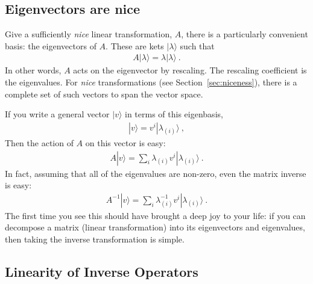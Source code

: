 \subsection{Eigenvectors are nice}
\label{sec:eigenvectors}

Give a sufficiently \emph{nice} linear transformation, $A$, there is a particularly convenient basis: the eigenvectors of $A$. These are kets $|\lambda\rangle$ such that
\begin{align}
  A |\lambda\rangle = \lambda |\lambda\rangle \ .
\end{align}
In other words, $A$ acts on the eigenvector by rescaling. The rescaling coefficient is the eigenvalues. For \emph{nice} transformations (see Section~\ref{sec:niceness}), there is a complete set of such vectors to span the vector space.

If you write a general vector $|v\rangle$ in terms of this eigenbasis,
\begin{align}
  |v\rangle = v^i |\lambda_{(i)} \rangle \ ,
\end{align}
Then the action of $A$ on this vector is easy:
\begin{align}
  A |v\rangle = \sum_i \lambda_{(i)} v^i |\lambda_{(i)} \rangle \ .
\end{align}
In fact, assuming that all of the eigenvalues are non-zero, even the matrix inverse is easy:
\begin{align}
  A^{-1}|v\rangle = \sum_i \lambda_{(i)}^{-1} v^i |\lambda_{(i)} \rangle \ .
  \label{eq:linear:aglebra:inverse:eigenvectors}
\end{align}
The first time you see this should have brought a deep joy to your life: if you can decompose a matrix (linear transformation) into its eigenvectors and eigenvalues, then taking the inverse transformation is simple.


\subsection{Linearity of Inverse Operators}

